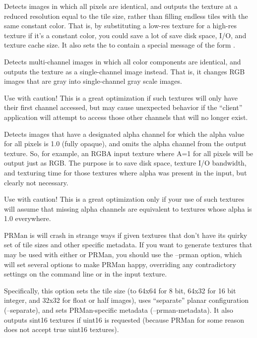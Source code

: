 Detects images in which all pixels are identical, and outputs the
texture at a reduced resolution equal to the tile size, rather than
filling endless tiles with the same constant color.  That is, by
substituting a low-res texture for a high-res texture if it's a constant
color, you could save a lot of save disk space, I/O, and texture cache size.
It also sets the  to contain a
special message of the form .  
\apiend

Detects multi-channel images in which all color components are
identical, and outputs the texture as a single-channel image instead.
That is, it changes RGB images that are gray into single-channel gray
scale images.

Use with caution!  This is a great optimization if such textures will
only have their first channel accessed, but may cause unexpected behavior
if the ``client'' application will attempt to access those other
channels that will no longer exist.
\apiend

Detects images that have a designated alpha channel for which the alpha value
for all pixels is 1.0 (fully opaque), and omits the alpha channel from
the output texture.  So, for example, an RGBA input texture where A=1
for all pixels will be output just as RGB.  The purpose is to save disk
space, texture I/O bandwidth, and texturing time for those textures
where alpha was present in the input, but clearly not necessary.

Use with caution!  This is a great optimization only if your use of such
textures will assume that missing alpha channels are equivalent to
textures whose alpha is 1.0 everywhere.
\apiend

PRMan is will crash in strange ways if given textures that don't have
its quirky set of tile sizes and other specific metadata.  If you want
\maketx to generate textures that may be used with either \OpenImageIO
or PRMan, you should use the {\cf --prman} option, which will set
several options to make PRMan happy, overriding any contradictory
settings on the command line or in the input texture.  

Specifically, this option sets the tile size (to 64x64 for 8 bit,
64x32 for 16 bit integer, and 32x32 for float or {\cf half} images),
uses ``separate'' planar configuration ({\cf --separate}), and sets
PRMan-specific metadata ({\cf --prman-metadata}).  It also outputs 
sint16 textures if uint16 is requested (because PRMan for some reason
does not accept true uint16 textures).

